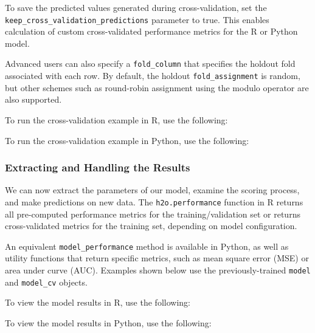 {{To save the predicted values generated during cross-validation, set the\\ \texttt{keep\_cross\_validation\_predictions} parameter to true.  This enables calculation of custom cross-validated performance metrics for the R or Python model.  

Advanced users can also specify a \texttt{fold\_column} that specifies the holdout fold associated with each row. By default, the holdout \texttt{fold\_assignment} is random, but other schemes such as round-robin assignment using the modulo operator are also supported.  

To run the cross-validation example in R, use the following: 

\waterExampleInR


\newpage
To run the cross-validation example in Python, use the following: 

\waterExampleInPython


\subsubsection{Extracting and Handling the Results} 

We can now extract the parameters of our model, examine the scoring process, and make predictions on new data.  The \texttt{h2o.performance} function in R returns all pre-computed performance metrics for the training/validation set or returns cross-validated metrics for the training set, depending on model configuration. 

An equivalent \texttt{model\_performance} method is available in Python, as well as utility functions that return specific metrics, such as mean square error (MSE) or area under curve (AUC).  Examples shown below use the previously-trained \texttt{model} and \texttt{model\_cv} objects.

\newpage
To view the model results in R, use the following: 

\waterExampleInR



To view the model results in Python, use the following: 

\waterExampleInPython



}}
